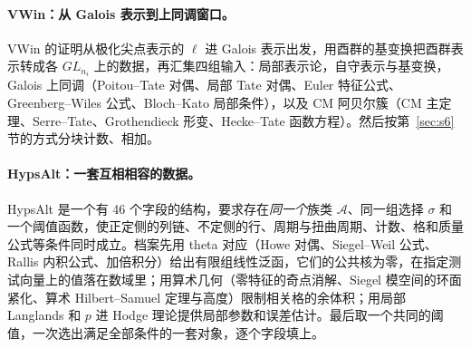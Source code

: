 \documentclass[11pt]{article}
\begin{document}
\paragraph{\textsf{VWin}：从 Galois 表示到上同调窗口。} \textsf{VWin} 的证明从极化尖点表示的 $\ell$ 进 Galois 表示出发，用酉群的基变换把酉群表示转成各 $GL_{n_i}$ 上的数据，再汇集四组输入：局部表示论，自守表示与基变换，Galois 上同调（Poitou–Tate 对偶、局部 Tate 对偶、Euler 特征公式、Greenberg–Wiles 公式、Bloch–Kato 局部条件），以及 CM 阿贝尔簇（CM 主定理、Serre–Tate、Grothendieck 形变、Hecke–Tate 函数方程）。然后按第~\ref{sec:s6} 节的方式分块计数、相加。

\paragraph{\textsf{HypsAlt}：一套互相相容的数据。} \textsf{HypsAlt} 是一个有 46 个字段的结构，要求存在\emph{同一个}族类 $\mathcal A$、同一组选择 $\sigma$ 和一个阈值函数，使正定侧的列链、不定侧的行、周期与扭曲周期、计数、格和质量公式等条件同时成立。档案先用 theta 对应（Howe 对偶、Siegel–Weil 公式、Rallis 内积公式、加倍积分）给出有限组线性泛函，它们的公共核为零，在指定测试向量上的值落在数域里；用算术几何（零特征的奇点消解、Siegel 模空间的环面紧化、算术 Hilbert–Samuel 定理与高度）限制相关格的余体积；用局部 Langlands 和 $p$ 进 Hodge 理论提供局部参数和误差估计。最后取一个共同的阈值，一次选出满足全部条件的一套对象，逐个字段填上。
\end{document}
